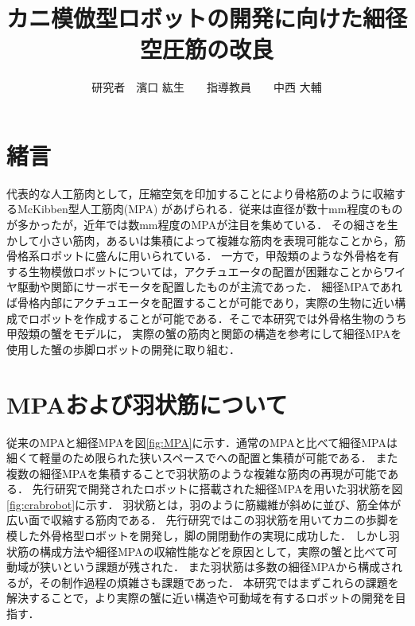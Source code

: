 \documentclass{jarticle}
\begin{document}

\title{
カニ模倣型ロボットの開発に向けた細径空圧筋の改良
}
\author{
研究者　濱口 紘生　　指導教員　　中西 大輔
}

\maketitle

\thispagestyle{empty}  %

\section{緒言}

代表的な人工筋肉として，圧縮空気を印加することにより骨格筋のように収縮するMcKibben型人工筋肉(MPA)
があげられる．従来は直径が数十mm程度のものが多かったが，近年では数mm程度のMPAが注目を集めている\cite{wakimoto}．
その細さを生かして小さい筋肉，あるいは集積によって複雑な筋肉を表現可能なことから，筋骨格系ロボットに盛んに用いられている\cite{wakimoto}．
一方で，甲殻類のような外骨格を有する生物模倣ロボットについては，アクチュエータの配置が困難なことからワイヤ駆動や関節にサーボモータを配置したものが主流であった\cite{crabrobot1}．
細径MPAであれば骨格内部にアクチュエータを配置することが可能であり，実際の生物に近い構成でロボットを作成することが可能である．そこで本研究では外骨格生物のうち甲殻類の蟹をモデルに，
実際の蟹の筋肉と関節の構造を参考にして細径MPAを使用した蟹の歩脚ロボットの開発に取り組む．

\vspace*{-2mm}
\section{MPAおよび羽状筋について}

従来のMPAと細径MPAを図\ref{fig:MPA}に示す．通常のMPAと比べて細径MPAは細くて軽量のため限られた狭いスペースでへの配置と集積が可能である．
また複数の細径MPAを集積することで羽状筋のような複雑な筋肉の再現が可能である．
先行研究\cite{crabrobot2}で開発されたロボットに搭載された細径MPAを用いた羽状筋を図\ref{fig:crabrobot}に示す．
羽状筋とは，羽のように筋繊維が斜めに並び、筋全体が広い面で収縮する筋肉である．
先行研究\cite{crabrobot2}ではこの羽状筋を用いてカニの歩脚を模した外骨格型ロボットを開発し，脚の開閉動作の実現に成功した．
しかし羽状筋の構成方法や細径MPAの収縮性能などを原因として，実際の蟹と比べて可動域が狭いという課題が残された．
また羽状筋は多数の細径MPAから構成されるが，その制作過程の煩雑さも課題であった．
本研究ではまずこれらの課題を解決することで，より実際の蟹に近い構造や可動域を有するロボットの開発を目指す．
\end{document}
